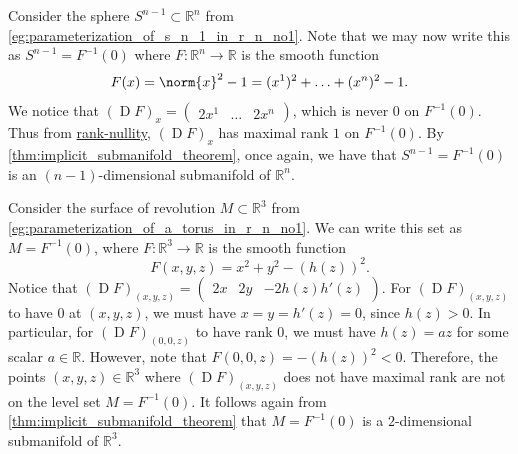 \documentclass[notoc,notitlepage]{tufte-book}
\DeclareMathOperator{\D}{D}
\begin{document}
\begin{eg}\label{eg:parameterization_of_s_n_1_in_r_n_no2}
  Consider the sphere $S^{n - 1} \subset \mathbb{R}^n$ from
  \cref{eg:parameterization_of_s_n_1_in_r_n_no1}. Note that we may now write this
  as $S^{ n - 1 } = F^{-1}(0)$ where $F : \mathbb{R}^n \to \mathbb{R}$ is the
  smooth function
  \begin{equation*}
    F(x) = \norm{x}^2 - 1 = (x^1)^2 + \hdots + (x^n)^2 - 1.
  \end{equation*}
  We notice that $(\D F)_x = \begin{pmatrix} 2x^1 & \hdots & 2x^n
  \end{pmatrix}$, which is never $0$ on $F^{-1}(0)$. Thus from
  \hyperref[thm:rank_nullity_theorem]{rank-nullity}, $(\D F)_x$ has maximal rank
  $1$ on $F^{-1}(0)$. By
  \cref{thm:implicit_submanifold_theorem}, once again,
  we have that $S^{n - 1} = F^{-1}(0)$ is an $(n - 1)$-dimensional submanifold
  of $\mathbb{R}^n$.
\end{eg}

\begin{eg}
  Consider the surface of revolution $M \subset \mathbb{R}^3$ from
  \cref{eg:parameterization_of_a_torus_in_r_n_no1}. We can write this set as $M =
  F^{-1}(0)$, where $F : \mathbb{R}^3 \to \mathbb{R}$ is the smooth function
  \begin{equation*}
    F(x, y, z) = x^2 + y^2 - (h(z))^2.
  \end{equation*}
  Notice that $(\D F)_{(x, y, z)} = \begin{pmatrix} 2x & 2y & -2h(z)h'(z)
  \end{pmatrix}$. For $(\D F)_{(x, y, z)}$ to have $0$ at $(x, y, z)$, we
  must have $x = y = h'(z) = 0$, since $h(z) > 0$. In particular, for $(\D
  F)_{(0, 0, z)}$ to have rank $0$, we must have $h(z) = az$ for some scalar $a \in
  \mathbb{R}$. However, note that $F(0, 0, z) = -(h(z))^2 < 0$. Therefore, the
  points $(x, y, z) \in \mathbb{R}^3$ where $(\D F)_{(x, y, z)}$ does not have
  maximal rank are not on the level set $M = F^{-1}(0)$. It follows again from
  \cref{thm:implicit_submanifold_theorem} that $M =
  F^{-1}(0)$ is a $2$-dimensional submanifold of $\mathbb{R}^3$.
\end{eg}
\end{document}
